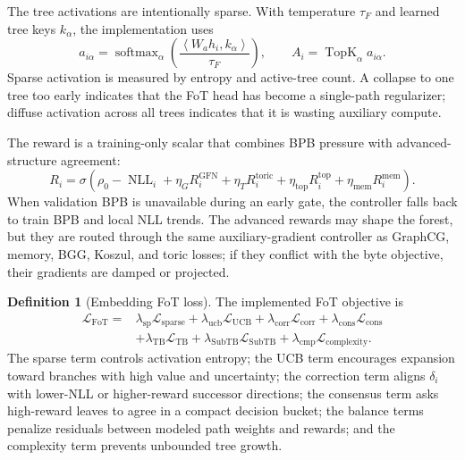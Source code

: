 \documentclass[11pt]{article}
\theoremstyle{definition}
\newtheorem{definition}{Definition}[section]
\theoremstyle{plain}
\theoremstyle{remark}
\numberwithin{equation}{section}
\newcommand{\ip}[2]{\left\langle #1,#2\right\rangle}
\begin{document}
The tree activations are intentionally sparse.  With temperature $\tau_F$ and learned tree keys $k_\alpha$, the implementation uses
\begin{equation}
  a_{i\alpha}=
  \operatorname{softmax}_\alpha
  \left(\frac{\ip{W_a h_i}{k_\alpha}}{\tau_F}\right),
  \qquad
  A_i=\operatorname{TopK}_\alpha a_{i\alpha}.
\end{equation}
Sparse activation is measured by entropy and active-tree count.  A collapse to one tree too early indicates that the FoT head has become a single-path regularizer; diffuse activation across all trees indicates that it is wasting auxiliary compute.

The reward is a training-only scalar that combines BPB pressure with advanced-structure agreement:
\begin{equation}
  R_i=
  \sigma\left(
    \rho_0-\operatorname{NLL}_i
    +\eta_G R_i^{\mathrm{GFN}}
    +\eta_T R_i^{\mathrm{toric}}
    +\eta_{\mathrm{top}}R_i^{\mathrm{top}}
    +\eta_{\mathrm{mem}}R_i^{\mathrm{mem}}
  \right).
\end{equation}
When validation BPB is unavailable during an early gate, the controller falls back to train BPB and local NLL trends.  The advanced rewards may shape the forest, but they are routed through the same auxiliary-gradient controller as GraphCG, memory, BGG, Koszul, and toric losses; if they conflict with the byte objective, their gradients are damped or projected.

\begin{definition}[Embedding FoT loss]
The implemented FoT objective is
\begin{equation}
\begin{split}
  \mathcal L_{\mathrm{FoT}}={}&
  \lambda_{\mathrm{sp}}\mathcal L_{\mathrm{sparse}}
  +\lambda_{\mathrm{ucb}}\mathcal L_{\mathrm{UCB}}
  +\lambda_{\mathrm{corr}}\mathcal L_{\mathrm{corr}}
  +\lambda_{\mathrm{cons}}\mathcal L_{\mathrm{cons}}\\
  &+\lambda_{\mathrm{TB}}\mathcal L_{\mathrm{TB}}
  +\lambda_{\mathrm{SubTB}}\mathcal L_{\mathrm{SubTB}}
  +\lambda_{\mathrm{cmp}}\mathcal L_{\mathrm{complexity}} .
\end{split}
\end{equation}
The sparse term controls activation entropy; the UCB term encourages expansion toward branches with high value and uncertainty; the correction term aligns $\delta_i$ with lower-NLL or higher-reward successor directions; the consensus term asks high-reward leaves to agree in a compact decision bucket; the balance terms penalize residuals between modeled path weights and rewards; and the complexity term prevents unbounded tree growth.
\end{definition}
\end{document}
